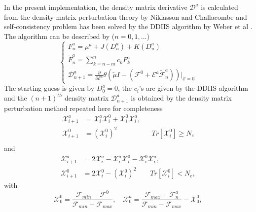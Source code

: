 \documentclass[twocolumn,showpacs,preprintnumbers,amsmath,amssymb]{revtex4}
\begin{document}
 In the present implementation, the density matrix derivative
 $\mathcal{D}^a$ is calculated from the density 
 matrix perturbation theory by Niklasson and Challacombe
 \cite{Anders} and self-consistency problem
 has been solved by the DDIIS algorithm by 
 Weber et al \cite{Weber_2003}.
 The algorithm can be described by ($n=0,1,\ldots$)
 \begin{equation}\label{alg}
   \left\{ \begin{array}{lll}
     F^a_{n}=\mu^a+J(D^a_n)+K(D^a_n) \\
     \displaystyle\widetilde{F}^a_{n}=\sum_{k=n-m}^{n}c_k F^a_{k}\\
     \displaystyle\mathcal{D}^a_{n+1}=\frac{\partial}{\partial \mathcal{E}^a}
     \theta(\tilde{\mu}I-(\mathcal{F}^{0}
     +\mathcal{E}^{a}\widetilde{\mathcal{F}}^{a}_n))
     \bigg|_{\mathcal{E}=0}
   \end{array} \right.
 \end{equation}
 The starting guess is given by $D^a_0=0$, the $c_i$'s are given
 by the DDIIS algorithm \cite{Weber_2003} and the $(n+1)^{th}$
 density matrix $\mathcal{D}^a_{n+1}$ is obtained by 
 the density matrix perturbation method \cite{Anders}
 repeated here for completeness
\begin{equation}
\begin{split}
  \mathcal{X}^a_{i+1}&=
          \mathcal{X}^a_{i}\mathcal{X}^0_{i}+\mathcal{X}^0_{i}\mathcal{X}^a_{i},\\
  \mathcal{X}^0_{i+1}&=(\mathcal{X}^0_{i})^2
          \qquad\qquad\quad Tr[\mathcal{X}^0_{i}]\ge N_e \\
\end{split}
\end{equation}
and
\begin{equation}
\begin{split}
  \mathcal{X}^a_{i+1}&=2\mathcal{X}^a_{i}-\mathcal{X}^a_{i}\mathcal{X}^0_{i}
          -\mathcal{X}^0_{i}\mathcal{X}^a_{i},\\
  \mathcal{X}^0_{i+1}&=2\mathcal{X}^0_{i}-(\mathcal{X}^0_{i})^2
          \qquad Tr[\mathcal{X}^0_{i}]< N_e,
\end{split}
\end{equation}
 with
 \begin{equation}
  \mathcal{X}^0_{0}=\frac{\mathcal{F}_{min}-\mathcal{F}^0}
               {\mathcal{F}_{min}-\mathcal{F}_{max}},
  \quad
  \mathcal{X}^a_{0}=\frac{\mathcal{F}_{max}-\mathcal{F}^a_{n}}
               {\mathcal{F}_{min}-\mathcal{F}_{max}}-\mathcal{X}^0_{0},
 \end{equation}
\end{document}
